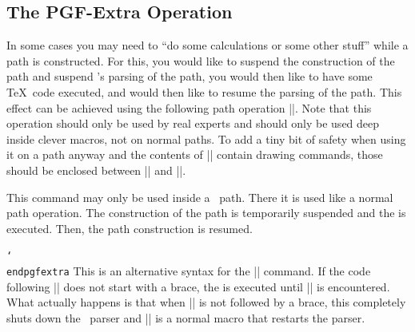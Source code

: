 \subsection{The PGF-Extra Operation}

In some cases you may need to ``do some calculations or some other stuff''
while a path is constructed. For this, you would like to suspend the
construction of the path and suspend \tikzname's parsing of the path, you would
then like to have some \TeX\ code executed, and would then like to resume the
parsing of the path. This effect can be achieved using the following path
operation |\pgfextra|. Note that this operation should only be used by real
experts and should only be used deep inside clever macros, not on normal paths.
To add a tiny bit of safety when using it on a path anyway and the contents of
|\pgfextra| contain drawing commands, those should be enclosed between
|\pgfinterruptpath| and |\endpgfinterruptpath|.

\begin{command}{\pgfextra{}}
    This command may only be used inside a \tikzname\ path. There it is used
    like a normal path operation. The construction of the path is temporarily
    suspended and the  is executed. Then, the path construction is
    resumed.
\begin{codeexample}[]
\newdimen\mydim
\begin{tikzpicture}
  \mydim=1cm
  \draw (0pt,\mydim) \pgfextra{\mydim=2cm} -- (0pt,\mydim);
\end{tikzpicture}
\end{codeexample}
\end{command}

\begin{command}{\pgfextra {} \texttt{\char`\\endpgfextra}}
    This is an alternative syntax for the |\pgfextra| command. If the code
    following |\pgfextra| does not start with a brace, the  is
    executed until |\endpgfextra| is encountered. What actually happens is that
    when |\pgfextra| is not followed by a brace, this completely shuts down the
    \tikzname\ parser and |\endpgfextra| is a normal macro that restarts the
    parser.
\begin{codeexample}[]
\newdimen\mydim
\begin{tikzpicture}
  \mydim=1cm
  \draw (0pt,\mydim)
    \pgfextra \mydim=2cm \endpgfextra -- (0pt,\mydim);
\end{tikzpicture}
\end{codeexample}
\end{command}


